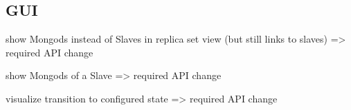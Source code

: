 \subsection{GUI}

show Mongods instead of Slaves in replica set view (but still links to slaves)
=> required API change

show Mongods of a Slave
=> required API change

visualize transition to configured state
=> required API change
